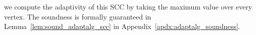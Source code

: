 we compute the adaptivity of this SCC by taking the maximum 
value over every vertex.
%
The soundness is formally guaranteed in Lemma~\ref{lem:sound_adaptalg_scc} in Appendix~\ref{apdx:adaptalg_soundness}.

